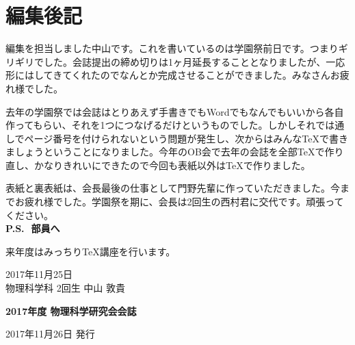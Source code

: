\documentclass[10pt,b5paper,papersize]{jsbook}
\begin{document}
%
\backmatter %


%
\chapter*{編集後記}
編集を担当しました中山です。これを書いているのは学園祭前日です。つまりギリギリでした。会誌提出の締め切りは1ヶ月延長することとなりましたが、一応形にはしてきてくれたのでなんとか完成させることができました。みなさんお疲れ様でした。\par
去年の学園祭では会誌はとりあえず手書きでもWordでもなんでもいいから各自作ってもらい、それを1つにつなげるだけというものでした。しかしそれでは通しでページ番号を付けられないという問題が発生し、次からはみんな\TeX で書きましょうということになりました。今年のOB会で去年の会誌を全部\TeX で作り直し、かなりきれいにできたので今回も表紙以外は\TeX で作りました。\par
表紙と裏表紙は、会長最後の仕事として門野先輩に作っていただきました。今までお疲れ様でした。学園祭を期に、会長は2回生の西村君に交代です。頑張ってください。
 \vspace{3mm}\\
{\bf P.S. \,\,部員へ}\par
来年度はみっちり\TeX 講座を行います。
\begin{flushright}
  2017年11月25日\\
  物理科学科 2回生 中山 敦貴
\end{flushright}

\vspace{8zw} \hrulefill \par
{\large \bf 2017年度 物理科学研究会会誌}\par
\quad 2017年11月26日 発行
\end{document}
